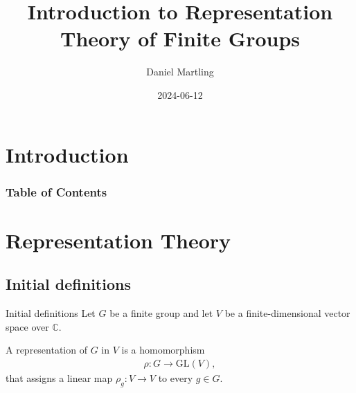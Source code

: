 \documentclass[10pt]{beamer}
\title[Representation Theory]{Introduction to Representation Theory of Finite Groups}
\author[Daniel Martling]{
	Daniel Martling}%
\date{2024-06-12}
\newcommand{\GL}{\text{GL}}
\newcommand{\CC}{\mathbb{C}}
\begin{document}
	\begin{frame}
		\maketitle
	\end{frame}
	
	
	
	\section{Introduction}
	
	
	\begin{frame}
		\frametitle{Table of Contents}
		\tableofcontents
	\end{frame}
	
	\section{Representation Theory}
	\subsection{Initial definitions}
	
	\begin{frame}{Initial definitions}
		Let $G$ be a finite group and let $V$ be a finite-dimensional vector space over $\CC$.\pause
		
		\begin{definition}
			A representation of $G$ in $V$ is a homomorphism
			\begin{align*}
				\rho : G \rightarrow \GL(V),
			\end{align*}
			that assigns a linear map $\rho_g: V \rightarrow V$ to every $g \in G$.
		\end{definition}
	\end{frame}	
	
\end{document}
